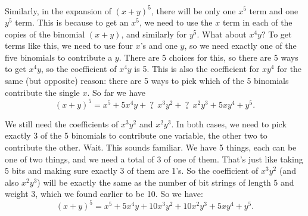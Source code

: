 \documentclass[10pt,]{book}
\theoremstyle{plain}
\theoremstyle{definition}
\theoremstyle{definition}
\theoremstyle{definition}
\numberwithin{equation}{section}
\begin{document}
        Similarly, in the expansion of \((x+y)^5\), there will be only one \(x^5\) term and one \(y^5\) term. This is because to get an \(x^5\), we need to use the \(x\) term in each of the copies of the binomial \((x+y)\), and similarly for \(y^5\). What about \(x^4y\)? To get terms like this, we need to use four \(x\)'s and one \(y\), so we need exactly one of the five binomials to contribute a \(y\). There are 5 choices for this, so there are 5 ways to get \(x^4y\), so the coefficient of \(x^4y\) is 5. This is also the coefficient for \(xy^4\) for the same (but opposite) reason: there are 5 ways to pick which of the 5 binomials contribute the single \(x\). So far we have
        \begin{equation*}
          (x+y)^5 = x^5 + 5x^4y + \underline{~?~}~x^3y^2 + \underline{~?~}~x^2y^3 + 5 xy^4 + y^5.
        \end{equation*}
\par

        We still need the coefficients of \(x^3y^2\) and \(x^2y^3\). In both cases, we need to pick exactly 3 of the 5 binomials to contribute one variable, the other two to contribute the other. Wait. This sounds familiar. We have 5 things, each can be one of two things, and we need a total of 3 of one of them. That's just like taking 5 bits and making sure exactly 3 of them are 1's. So the coefficient of \(x^3y^2\) (and also \(x^2y^3\)) will be exactly the same as the number of bit strings of length 5 and weight 3, which we found earlier to be 10. So we have:
        \begin{equation*}
          (x+y)^5 = x^5 + 5x^4y + 10x^3y^2 + 10x^2y^3 + 5 xy^4 + y^5.
        \end{equation*}
\par
\end{document}
